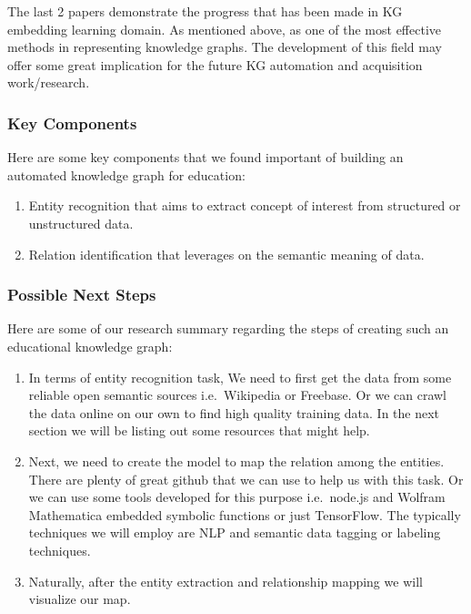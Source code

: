 \documentclass[]{book}
\theoremstyle{definition}
\theoremstyle{definition}
\theoremstyle{definition}
\theoremstyle{remark}
\begin{document}
The last 2 papers demonstrate the progress that has been made in KG
embedding learning domain. As mentioned above, as one of the most
effective methods in representing knowledge graphs. The development of
this field may offer some great implication for the future KG automation
and acquisition work/research.

\subsubsection{Key Components}\label{key-components}

Here are some key components that we found important of building an
automated knowledge graph for education:

\begin{enumerate}
\def\labelenumi{\arabic{enumi}.}
\item
  Entity recognition that aims to extract concept of interest from
  structured or unstructured data.
\item
  Relation identification that leverages on the semantic meaning of
  data.
\end{enumerate}

\subsubsection{Possible Next Steps}\label{possible-next-steps}

Here are some of our research summary regarding the steps of creating
such an educational knowledge graph:

\begin{enumerate}
\def\labelenumi{\arabic{enumi}.}
\item
  In terms of entity recognition task, We need to first get the data
  from some reliable open semantic sources i.e.~Wikipedia or Freebase.
  Or we can crawl the data online on our own to find high quality
  training data. In the next section we will be listing out some
  resources that might help.
\item
  Next, we need to create the model to map the relation among the
  entities. There are plenty of great github that we can use to help us
  with this task. Or we can use some tools developed for this purpose
  i.e.~node.js and Wolfram Mathematica embedded symbolic functions or
  just TensorFlow. The typically techniques we will employ are NLP and
  semantic data tagging or labeling techniques.
\item
  Naturally, after the entity extraction and relationship mapping we
  will visualize our map.
\end{enumerate}
\end{document}
